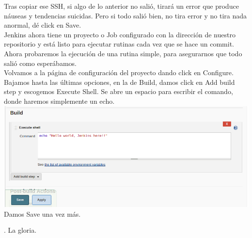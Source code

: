\documentclass[a4paper]{article}
\begin{document}
{   Tras copiar ese SSH, si algo de lo anterior no salió, tirará un error que produce náuseas y tendencias suicidas. Pero si todo salió bien, no tira error y no tira nada anormal, dé click en Save. \\
   
   Jenkins ahora tiene un proyecto o Job configurado con la dirección de nuestro repositorio y está listo para ejecutar rutinas cada vez que se hace un commit. Ahora probaremos la ejecución de una rutina simple, para asegurarnos que todo salió como esperábamos. \\
   
   Volvamos a la página de configuración del proyecto dando click en Configure. Bajamos hasta las últimas opciones, en la de Build, damos click en Add build step y escogemos Execute Shell. Se abre un espacio para escribir el comando, donde haremos simplemente un echo. \\
   
      \includegraphics[scale=0.3]{hellojenkins}\\
   
   Damos Save una vez más.  
   
   
   . La gloria. \\
   
}
\end{document}
